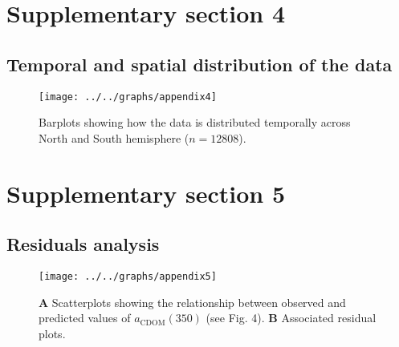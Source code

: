 \documentclass[12pt,a4paper]{scrartcl}
\begin{document}
\clearpage
\newpage

\section*{Supplementary section 4}
\subsection*{Temporal and spatial distribution of the data}

\begin{figure}[h]
	\centering
	\texttt{[image: ../../graphs/appendix4]}
	\caption{Barplots showing how the data is distributed temporally across North and South hemisphere ($n = 12808$).}
\end{figure}

\clearpage
\newpage

\section*{Supplementary section 5}
\subsection*{Residuals analysis}

\begin{figure}[H]
	\centering
	\texttt{[image: ../../graphs/appendix5]}
	\caption{\textbf{A} Scatterplots showing the relationship between observed and predicted values of $a_{\text{CDOM}}(350)$ (see Fig. 4). \textbf{B} Associated residual plots.}
\end{figure}
\end{document}

